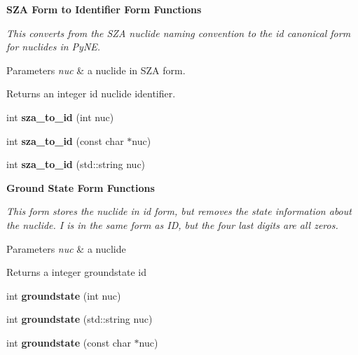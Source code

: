 \begin{Indent}\textbf{ S\+ZA Form to Identifier Form Functions}\par
{\em This converts from the S\+ZA nuclide naming convention to the id canonical form for nuclides in Py\+NE. 
\begin{DoxyParams}{Parameters}
{\em nuc} & a nuclide in S\+ZA form. \\
\hline
\end{DoxyParams}
\begin{DoxyReturn}{Returns}
an integer id nuclide identifier. 
\end{DoxyReturn}
}\begin{DoxyCompactItemize}
\item 
\mbox{\label{namespacepyne_1_1nucname_a2d97b24683f8a35a3ab716807fbfccbc}} 
int {\bfseries sza\+\_\+to\+\_\+id} (int nuc)
\item 
\mbox{\label{namespacepyne_1_1nucname_a364b3367dbdec6b1db26454e46206365}} 
int {\bfseries sza\+\_\+to\+\_\+id} (const char $\ast$nuc)
\item 
\mbox{\label{namespacepyne_1_1nucname_af4d6093c95bb523de10c8c6bb93224aa}} 
int {\bfseries sza\+\_\+to\+\_\+id} (std\+::string nuc)
\end{DoxyCompactItemize}
\end{Indent}
\begin{Indent}\textbf{ Ground State Form Functions}\par
{\em This form stores the nuclide in id form, but removes the state information about the nuclide. I is in the same form as ID, but the four last digits are all zeros. 
\begin{DoxyParams}{Parameters}
{\em nuc} & a nuclide \\
\hline
\end{DoxyParams}
\begin{DoxyReturn}{Returns}
a integer groundstate id 
\end{DoxyReturn}
}\begin{DoxyCompactItemize}
\item 
\mbox{\label{namespacepyne_1_1nucname_a81937700730c53c357f2902b9f7efa15}} 
int {\bfseries groundstate} (int nuc)
\item 
\mbox{\label{namespacepyne_1_1nucname_a1cc9dcbea2e73a8ffffed55fecff9766}} 
int {\bfseries groundstate} (std\+::string nuc)
\item 
\mbox{\label{namespacepyne_1_1nucname_a1eeed5454ab42774ebd86c84e1b3033f}} 
int {\bfseries groundstate} (const char $\ast$nuc)
\end{DoxyCompactItemize}
\end{Indent}
